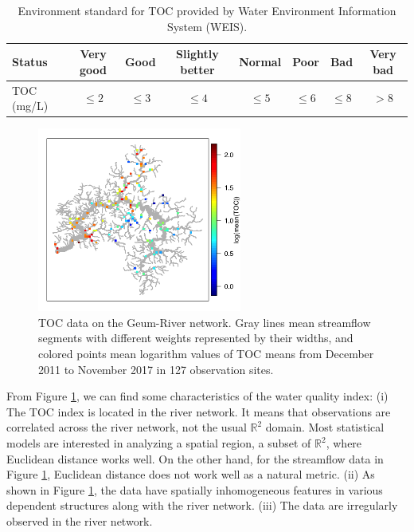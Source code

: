 \documentclass[11pt,titlepage]{article}
\begin{document}
\begin{table}[!h]
	\centering	
	\caption{Environment standard for TOC provided by Water Environment Information System (WEIS).}
	\begin{tabular}{|l|c|c|c|c|c|c|c|}
		\hline
		Status & Very good & Good & Slightly better & Normal & Poor & Bad & Very bad \\ \hline
		TOC (mg/L) & $\leq 2$ & $\leq 3$ & $\leq 4$ & $\leq 5$ & $\leq 6$ & $\leq 8$ & $>8$ \\ \hline
\end{tabular}
	\label{table:table1}
\end{table}

\begin{figure}
	\centering
	\includegraphics[width=0.6\textwidth]{Stream_result/Figure01.png}
	\vspace{-2mm}
	\caption{TOC data on the Geum-River network. Gray lines mean streamflow segments with different weights represented by their widths, and colored points mean logarithm values of TOC means from December 2011 to November 2017 in 127 observation sites.}
	\label{fig:fig1}
\end{figure}

From Figure \ref{fig:fig1}, we can find some characteristics of the water quality index: (i) The TOC index is located in the river network. It means that observations are correlated across the river network, not the usual $\mathbb{R}^2$ domain. Most statistical models are interested in analyzing a spatial region, a subset of $\mathbb{R}^2$, where Euclidean distance works well. On the other hand, for the streamflow data in Figure \ref{fig:fig1}, Euclidean distance does not work well as a natural metric. (ii) As shown in Figure \ref{fig:fig1}, the data have spatially inhomogeneous features in various dependent structures along with the river network. (iii) The data are irregularly observed in the river network.  
\end{document}

